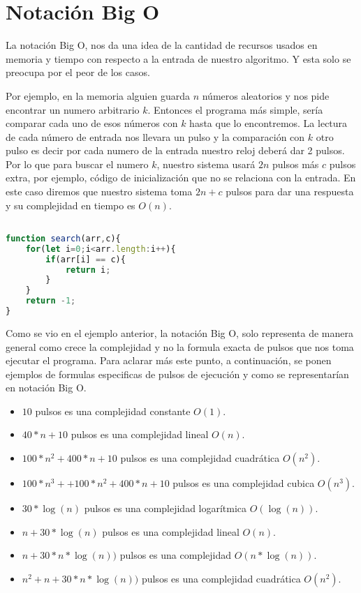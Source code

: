 \section{Notación Big O}
 
 La notación Big O, nos da una idea de la cantidad de recursos usados en memoria y tiempo con respecto a la entrada de nuestro algoritmo. Y esta solo se preocupa por el peor de los casos.
 
 
 Por ejemplo, en la memoria alguien guarda $n$ números aleatorios y nos pide encontrar un numero arbitrario $k$. Entonces el programa más simple, sería comparar cada uno de esos números con $k$ hasta que lo encontremos. La lectura de cada número de entrada nos llevara un pulso y la comparación con $k$ otro pulso es decir por cada numero de la entrada nuestro reloj deberá dar 2 pulsos. Por lo que para buscar el numero $k$, nuestro sistema usará $2n$ pulsos más $c$ pulsos extra, por ejemplo, código de inicialización que no se relaciona con la entrada. En este caso diremos que nuestro sistema toma $2n+c$ pulsos para dar una respuesta y su complejidad en tiempo es $O(n)$. 
 
 \begin{lstlisting}[language=JavaScript, caption=Busca un elemento c]

function search(arr,c){
    for(let i=0;i<arr.length:i++){
        if(arr[i] == c){
            return i;
        }
    }
    return -1;
}
\end{lstlisting}
 
Como se vio en el ejemplo anterior, la notación Big O, solo representa de manera general como crece la complejidad y no la formula exacta de pulsos que nos toma ejecutar el programa. Para aclarar más este punto, a continuación, se ponen ejemplos de formulas especificas de pulsos de ejecución y como se representarían en notación Big O.

\begin{itemize}
    \item $10$ pulsos es  una complejidad constante $O(1)$.
    \item $40*n+10$ pulsos es  una complejidad lineal $O(n)$.
    \item $100*n^2 + 400*n+10$ pulsos es  una complejidad cuadrática $O(n^2)$.
    \item $100*n^3 + + 100*n^2 + 400*n+10$ pulsos es  una complejidad cubica $O(n^3)$.
    \item $30*\log(n)$ pulsos es  una complejidad logarítmica $O(\log(n))$. 
    \item $n + 30*\log(n)$ pulsos es  una complejidad lineal $O(n)$.
    \item $n + 30*n*\log(n))$ pulsos es  una complejidad $O(n*\log(n))$.
    \item $n^2 + n + 30*n*\log(n))$ pulsos es  una complejidad cuadrática $O(n^2)$.
\end{itemize}

